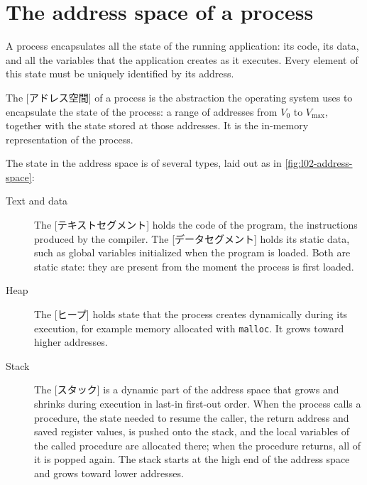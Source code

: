 \documentclass[../main.tex]{subfiles}
\begin{document}
\section{The address space of a process}
\label{sec:l02-address-space}

A process encapsulates all the state of the running application: its code,
its data, and all the variables that the application creates as it
executes.  Every element of this state must be uniquely
identified by its address.

\begin{definition}
  The [アドレス空間] of a process is the abstraction
  the operating system uses to encapsulate the state of the process: a range
  of addresses from $V_0$ to $V_{\max}$, together with the state stored at
  those addresses.  It is the in-memory representation of the process.
\end{definition}

The state in the address space is of several types, laid out as in
\cref{fig:l02-address-space}:
\begin{description}
  \item[Text and data] The [テキストセグメント] holds the
    code of the program, the instructions produced by the compiler.  The
    [データセグメント] holds its static data, such as
    global variables initialized when the program is loaded.  Both are
    static state: they are present from the moment the process is first
    loaded.
  \item[Heap] The [ヒープ] holds state that the process creates
    dynamically during its execution, for example memory allocated with
    \texttt{malloc}.  It grows toward higher addresses.
  \item[Stack] The [スタック] is a dynamic part of the address
    space that grows and shrinks during execution in last-in first-out
    order.  When the process calls a procedure, the state needed to resume
    the caller, the return address and saved register values, is pushed
    onto the stack, and the local variables of the called procedure are
    allocated there; when the procedure returns, all of it is popped again.
    The stack starts at the high end of
    the address space and grows toward lower addresses.

\end{description}
\end{document}
